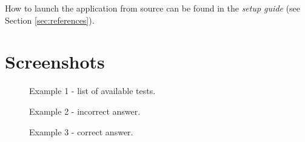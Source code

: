 \documentclass[11pt,a4paper]{article}
\begin{document}
How to launch the application from source can be found in the \textit{setup guide} (see Section \ref{sec:references}).

\section{Screenshots}

\begin{figure}[H]
    \centering
    \caption{Example 1 - list of available tests.}
    \label{fig:example1}
\end{figure}

\begin{figure}[H]
    \centering
    \caption{Example 2 - incorrect answer.}
    \label{fig:example2}
\end{figure}

\begin{figure}[H]
    \centering
    \caption{Example 3 - correct answer.}
    \label{fig:example3}
\end{figure}
\end{document}
